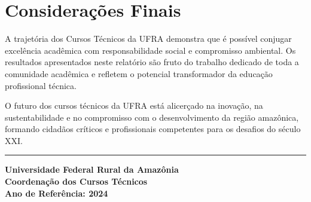 \documentclass[
  12pt,
  letterpaper,
]{report}
\begin{document}
\section{Considerações Finais}\label{considerauxe7uxf5es-finais}

A trajetória dos Cursos Técnicos da UFRA demonstra que é possível
conjugar excelência acadêmica com responsabilidade social e compromisso
ambiental. Os resultados apresentados neste relatório são fruto do
trabalho dedicado de toda a comunidade acadêmica e refletem o potencial
transformador da educação profissional técnica.

O futuro dos cursos técnicos da UFRA está alicerçado na inovação, na
sustentabilidade e no compromisso com o desenvolvimento da região
amazônica, formando cidadãos críticos e profissionais competentes para
os desafios do século XXI.

\begin{center}\rule{0.5\linewidth}{0.5pt}\end{center}

\textbf{Universidade Federal Rural da Amazônia}\\
\textbf{Coordenação dos Cursos Técnicos}\\
\textbf{Ano de Referência: 2024}
\end{document}
